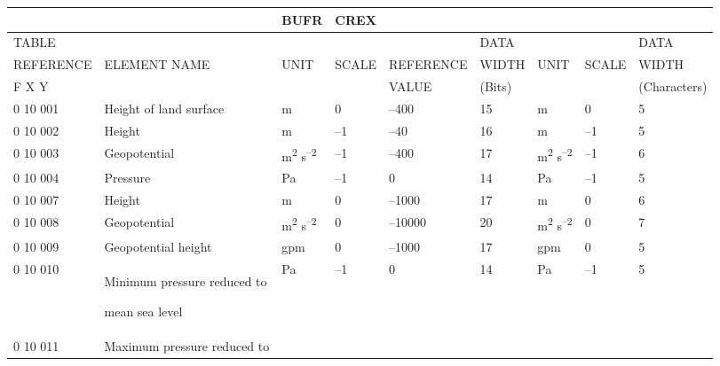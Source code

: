 \begin{longtable}[]{@{}lllllllll@{}}
\toprule
& & BUFR & CREX & & & & &\tabularnewline
\midrule
\endhead
TABLE & & & & & DATA & & & DATA\tabularnewline
REFERENCE & ELEMENT NAME & UNIT & SCALE & REFERENCE & WIDTH & UNIT & SCALE & WIDTH\tabularnewline
F X Y & & & & VALUE & (Bits) & & & (Characters)\tabularnewline
0 10 001 & Height of land surface & m & 0 & --400 & 15 & m & 0 & 5\tabularnewline
0 10 002 & Height & m & --1 & --40 & 16 & m & --1 & 5\tabularnewline
0 10 003 & Geopotential & m\textsuperscript{2} s\textsuperscript{--2} & --1 & --400 & 17 & m\textsuperscript{2} s\textsuperscript{--2} & --1 & 6\tabularnewline
0 10 004 & Pressure & Pa & --1 & 0 & 14 & Pa & --1 & 5\tabularnewline
0 10 007 & Height & m & 0 & --1000 & 17 & m & 0 & 6\tabularnewline
0 10 008 & Geopotential & m\textsuperscript{2} s\textsuperscript{--2} & 0 & --10000 & 20 & m\textsuperscript{2} s\textsuperscript{--2} & 0 & 7\tabularnewline
0 10 009 & Geopotential height & gpm & 0 & --1000 & 17 & gpm & 0 & 5\tabularnewline
\begin{minipage}[t]{0.08\columnwidth}\raggedright
0 10 010\strut
\end{minipage} & \begin{minipage}[t]{0.08\columnwidth}\raggedright
Minimum pressure reduced to

mean sea level\strut
\end{minipage} & \begin{minipage}[t]{0.08\columnwidth}\raggedright
Pa\strut
\end{minipage} & \begin{minipage}[t]{0.08\columnwidth}\raggedright
--1\strut
\end{minipage} & \begin{minipage}[t]{0.08\columnwidth}\raggedright
0\strut
\end{minipage} & \begin{minipage}[t]{0.08\columnwidth}\raggedright
14\strut
\end{minipage} & \begin{minipage}[t]{0.08\columnwidth}\raggedright
Pa\strut
\end{minipage} & \begin{minipage}[t]{0.08\columnwidth}\raggedright
--1\strut
\end{minipage} & \begin{minipage}[t]{0.08\columnwidth}\raggedright
5\strut
\end{minipage}\tabularnewline
\begin{minipage}[t]{0.08\columnwidth}\raggedright
0 10 011\strut
\end{minipage} & \begin{minipage}[t]{0.08\columnwidth}\raggedright
Maximum pressure reduced to


\end{minipage}
\end{longtable}
